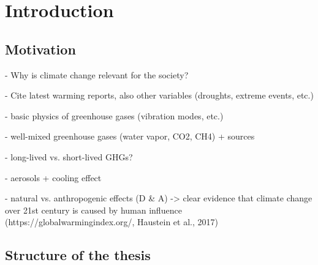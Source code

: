 


\chapter{Introduction}
\label{ch:01:introduction}


\section{Motivation}
\label{ch:01:motivation}

- Why is climate change relevant for the society?

- Cite latest warming reports, also other variables (droughts, extreme events,
etc.)

- basic physics of greenhouse gases (vibration modes, etc.)

- well-mixed greenhouse gases (water vapor, CO2, CH4) + sources

- long-lived vs. short-lived GHGs?

- aerosols + cooling effect

- natural vs. anthropogenic effects (D \& A) -> clear evidence that climate
change over 21st century is caused by human influence
(https://globalwarmingindex.org/, Haustein et al., 2017)


\section{Structure of the thesis}
\label{sec:01:structure}

